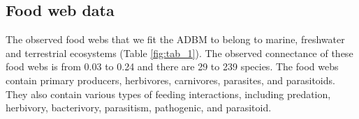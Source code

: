 \documentclass{article}
\begin{document}
\hypertarget{food-web-data}{%
\subsection{Food web data}\label{food-web-data}}

The observed food webs that we fit the ADBM to belong to marine,
freshwater and terrestrial ecosystems (Table \ref{fig:tab_1}). The
observed connectance of these food webs is from 0.03 to 0.24 and there
are 29 to 239 species. The food webs contain primary producers,
herbivores, carnivores, parasites, and parasitoids. They also contain
various types of feeding interactions, including predation, herbivory,
bacterivory, parasitism, pathogenic, and parasitoid.

\begin{landscape}\begin{table}


\end{table}
\end{landscape}
\end{document}
